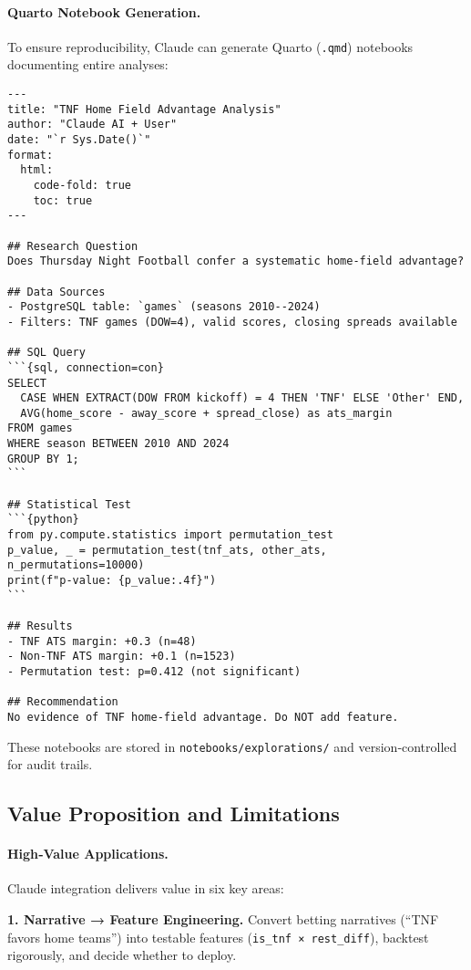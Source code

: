 \paragraph{Quarto Notebook Generation.}
To ensure reproducibility, Claude can generate Quarto (\texttt{.qmd}) notebooks documenting entire analyses:
\begin{verbatim}
---
title: "TNF Home Field Advantage Analysis"
author: "Claude AI + User"
date: "`r Sys.Date()`"
format:
  html:
    code-fold: true
    toc: true
---

## Research Question
Does Thursday Night Football confer a systematic home-field advantage?

## Data Sources
- PostgreSQL table: `games` (seasons 2010--2024)
- Filters: TNF games (DOW=4), valid scores, closing spreads available

## SQL Query
```{sql, connection=con}
SELECT
  CASE WHEN EXTRACT(DOW FROM kickoff) = 4 THEN 'TNF' ELSE 'Other' END,
  AVG(home_score - away_score + spread_close) as ats_margin
FROM games
WHERE season BETWEEN 2010 AND 2024
GROUP BY 1;
```

## Statistical Test
```{python}
from py.compute.statistics import permutation_test
p_value, _ = permutation_test(tnf_ats, other_ats, n_permutations=10000)
print(f"p-value: {p_value:.4f}")
```

## Results
- TNF ATS margin: +0.3 (n=48)
- Non-TNF ATS margin: +0.1 (n=1523)
- Permutation test: p=0.412 (not significant)

## Recommendation
No evidence of TNF home-field advantage. Do NOT add feature.
\end{verbatim}

These notebooks are stored in \texttt{notebooks/explorations/} and version‑controlled for audit trails.

\subsection{Value Proposition and Limitations}
\label{subsec:value_limitations}

\paragraph{High‑Value Applications.}
Claude integration delivers value in six key areas:

\textbf{1. Narrative → Feature Engineering.} Convert betting narratives (``TNF favors home teams'') into testable features (\texttt{is\_tnf × rest\_diff}), backtest rigorously, and decide whether to deploy.

